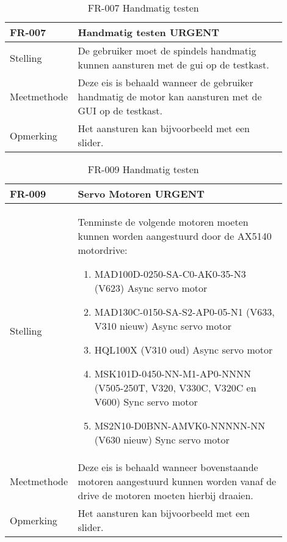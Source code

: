 \newpage

\begin{table}[ht]
	\caption{FR-007 Handmatig testen}
	\label{tab:FR-007}
	\centering
	\begin{tabular}{|p{0.15\linewidth}|p{0.75\linewidth}|}
		\hline
		FR-007 & Handmatig testen URGENT \\
		
		\hline
		
		Stelling & De gebruiker moet de spindels handmatig kunnen aansturen met de \gls{gui} op de testkast. \\
		
		Meetmethode & Deze eis is behaald wanneer de gebruiker handmatig de motor kan aansturen met de GUI op de testkast. \\
		
		Opmerking & Het aansturen kan bijvoorbeeld met een slider. \\
		\hline
	\end{tabular}
\end{table}

\newpage

\begin{table}[ht]
	\caption{FR-009 Handmatig testen}
	\label{tab:FR-009}
	\centering
	\begin{tabular}{|p{0.15\linewidth}|p{0.75\linewidth}|}
		\hline
		FR-009 & Servo Motoren URGENT \\
		
		\hline
		
		Stelling & Tenminste de volgende motoren moeten kunnen worden aangestuurd door de AX5140 motordrive:
		\begin{enumerate}
			\item MAD100D-0250-SA-C0-AK0-35-N3 (V623) Async servo motor
			\item MAD130C-0150-SA-S2-AP0-05-N1 (V633, V310 nieuw) Async servo motor
			\item HQL100X (V310 oud) Async servo motor
			\item MSK101D-0450-NN-M1-AP0-NNNN (V505-250T, V320, V330C, V320C en V600) Sync servo motor
			\item MS2N10-D0BNN-AMVK0-NNNNN-NN (V630 nieuw)  Sync servo motor
		\end{enumerate} \\
		
		Meetmethode & Deze eis is behaald wanneer bovenstaande motoren aangestuurd kunnen worden vanaf de drive de motoren moeten hierbij draaien. \\
		
		Opmerking & Het aansturen kan bijvoorbeeld met een slider. \\
		\hline
	\end{tabular}
\end{table}

